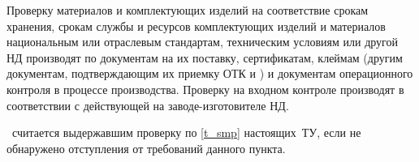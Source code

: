 Проверку материалов и комплектующих изделий на соответствие срокам хранения, срокам службы и ресурсов комплектующих изделий и материалов национальным или отраслевым стандартам, техническим условиям или другой НД производят по документам на их поставку, сертификатам, клеймам (другим документам, подтверждающим их приемку ОТК и \client) и документам операционного контроля в процессе производства. Проверку на входном контроле производят в соответствии с действующей на заводе-изготовителе НД.

\dut \ считается выдержавшим проверку по \ref{t_smp} настоящих~ТУ, если не обнаружено отступления от требований данного пункта.